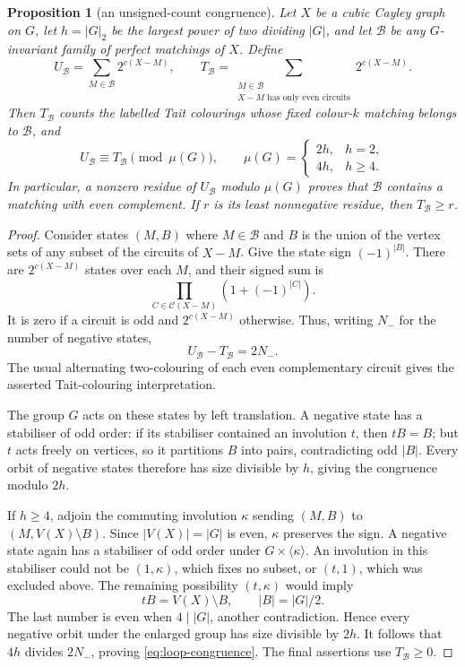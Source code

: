 \documentclass[11pt,a4paper]{article}
\newtheorem{proposition}[theorem]{Proposition}
\theoremstyle{definition}
\theoremstyle{remark}
\newcommand{\X}[3]{X(#1;#2,#3)}
\begin{document}
\begin{proposition}[an unsigned-count congruence]\label{prop:loop-congruence}
Let $X$ be a cubic Cayley graph on $G$, let $h=|G|_2$ be the largest power of two dividing $|G|$, and let $\mathcal B$ be any $G$-invariant family of perfect matchings of $X$.  Define
\[
 U_{\mathcal B}=\sum_{M\in\mathcal B}2^{c(X-M)},\qquad
 T_{\mathcal B}=\sum_{\substack{M\in\mathcal B\\X-M\text{ has only even circuits}}}
                    2^{c(X-M)}.
\]
Then $T_{\mathcal B}$ counts the labelled Tait colourings whose fixed colour-$k$ matching belongs to $\mathcal B$, and
\begin{equation}\label{eq:loop-congruence}
 U_{\mathcal B}\equiv T_{\mathcal B}\pmod{\mu(G)},\qquad
 \mu(G)=
 \begin{cases}
  2h,&h=2,\\
  4h,&h\ge4.
 \end{cases}
\end{equation}
In particular, a nonzero residue of $U_{\mathcal B}$ modulo $\mu(G)$ proves that $\mathcal B$ contains a matching with even complement.  If $r$ is its least nonnegative residue, then $T_{\mathcal B}\ge r$.
\end{proposition}
\begin{proof}
Consider states $(M,B)$ where $M\in\mathcal B$ and $B$ is the union of the vertex sets of any subset of the circuits of $X-M$.  Give the state sign $(-1)^{|B|}$.  There are $2^{c(X-M)}$ states over each $M$, and their signed sum is
\[
 \prod_{C\in\mathcal C(X-M)}(1+(-1)^{|C|}).
\]
It is zero if a circuit is odd and $2^{c(X-M)}$ otherwise.  Thus, writing $N_-$ for the number of negative states,
\[
 U_{\mathcal B}-T_{\mathcal B}=2N_-.
\]
The usual alternating two-colouring of each even complementary circuit gives the asserted Tait-colouring interpretation.

The group $G$ acts on these states by left translation.  A negative state has a stabiliser of odd order: if its stabiliser contained an involution $t$, then $tB=B$; but $t$ acts freely on vertices, so it partitions $B$ into pairs, contradicting odd $|B|$.  Every orbit of negative states therefore has size divisible by $h$, giving the congruence modulo $2h$.

If $h\ge4$, adjoin the commuting involution $\kappa$ sending $(M,B)$ to $(M,V(X)\setminus B)$.  Since $|V(X)|=|G|$ is even, $\kappa$ preserves the sign.  A negative state again has a stabiliser of odd order under $G\times\langle\kappa\rangle$.  An involution in this stabiliser could not be $(1,\kappa)$, which fixes no subset, or $(t,1)$, which was excluded above.  The remaining possibility $(t,\kappa)$ would imply
\[
 tB=V(X)\setminus B,\qquad |B|=|G|/2.
\]
The last number is even when $4\mid |G|$, another contradiction.  Hence every negative orbit under the enlarged group has size divisible by $2h$.  It follows that $4h$ divides $2N_-$, proving \eqref{eq:loop-congruence}.  The final assertions use $T_{\mathcal B}\ge0$.
\end{proof}
\end{document}
